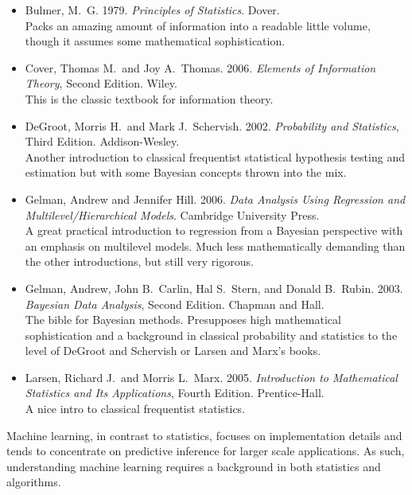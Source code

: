 \begin{itemize}
%
\item
Bulmer, M.~G.
1979.
{\it Principles of Statistics}.
Dover.
\\
{\footnotesize Packs an amazing amount of information into
a readable little volume, though it assumes some mathematical
sophistication.}
%
\item Cover, Thomas M.\ and Joy A.\ Thomas.
2006.
{\it Elements of Information Theory}, Second Edition.
Wiley.
\\
{\footnotesize This is the classic textbook for information theory.}
%
\item
DeGroot, Morris H.\ and Mark J.\ Schervish.
2002.
{\it Probability and Statistics},  Third Edition.
Addison-Wesley.
\\
{\footnotesize Another introduction to classical frequentist
statistical hypothesis testing and estimation but with some Bayesian
concepts thrown into the mix.}
%
\item
Gelman, Andrew and Jennifer Hill.
2006.
{\it Data Analysis Using Regression and Multilevel/Hierarchical Models}.
Cambridge University Press.
\\
{\footnotesize A great practical introduction to regression from a Bayesian
perspective with an emphasis on multilevel models.  Much less mathematically
demanding than the other introductions, but still very rigorous.}
%
\item
Gelman, Andrew, John B.~Carlin, Hal S.\ Stern, and Donald B.\ Rubin.
2003.
{\it Bayesian Data Analysis}, Second Edition.
Chapman and Hall.
\\
{\footnotesize The bible for Bayesian methods.  Presupposes high
mathematical sophistication and a background in classical probability
and statistics to the level of DeGroot and Schervish or Larsen
and Marx's books.}
%
\item
Larsen, Richard J.\ and Morris L.\ Marx.
2005.
{\it Introduction to Mathematical Statistics and Its Applications}, Fourth Edition.
Prentice-Hall.
\\
{\footnotesize A nice intro to classical frequentist statistics.}
%
\end{itemize}



\noindent
Machine learning, in contrast to statistics, focuses on implementation
details and tends to concentrate on predictive inference for larger
scale applications.  As such, understanding machine learning requires
a background in both statistics and algorithms.

